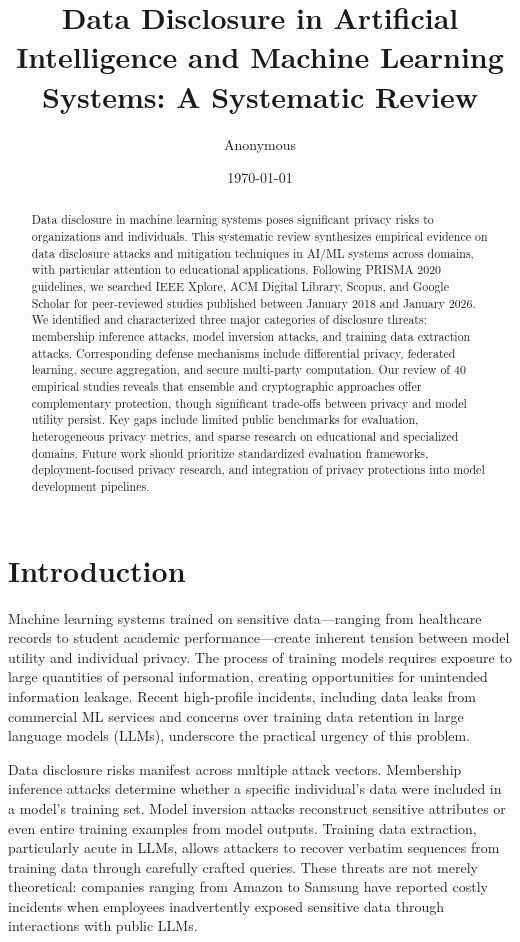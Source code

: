 \documentclass[11pt,a4paper]{article}
\title{Data Disclosure in Artificial Intelligence and Machine Learning Systems: A Systematic Review}
\author{Anonymous}
\date{\today}
\begin{document}
\maketitle

\begin{abstract}
Data disclosure in machine learning systems poses significant privacy risks to organizations and individuals. This systematic review synthesizes empirical evidence on data disclosure attacks and mitigation techniques in AI/ML systems across domains, with particular attention to educational applications. Following PRISMA 2020 guidelines, we searched IEEE Xplore, ACM Digital Library, Scopus, and Google Scholar for peer-reviewed studies published between January 2018 and January 2026. We identified and characterized three major categories of disclosure threats: membership inference attacks, model inversion attacks, and training data extraction attacks. Corresponding defense mechanisms include differential privacy, federated learning, secure aggregation, and secure multi-party computation. Our review of 40 empirical studies reveals that ensemble and cryptographic approaches offer complementary protection, though significant trade-offs between privacy and model utility persist. Key gaps include limited public benchmarks for evaluation, heterogeneous privacy metrics, and sparse research on educational and specialized domains. Future work should prioritize standardized evaluation frameworks, deployment-focused privacy research, and integration of privacy protections into model development pipelines.
\end{abstract}

\section{Introduction}

Machine learning systems trained on sensitive data—ranging from healthcare records to student academic performance—create inherent tension between model utility and individual privacy. The process of training models requires exposure to large quantities of personal information, creating opportunities for unintended information leakage. Recent high-profile incidents, including data leaks from commercial ML services and concerns over training data retention in large language models (LLMs), underscore the practical urgency of this problem.

Data disclosure risks manifest across multiple attack vectors. Membership inference attacks determine whether a specific individual's data were included in a model's training set. Model inversion attacks reconstruct sensitive attributes or even entire training examples from model outputs. Training data extraction, particularly acute in LLMs, allows attackers to recover verbatim sequences from training data through carefully crafted queries. These threats are not merely theoretical: companies ranging from Amazon to Samsung have reported costly incidents when employees inadvertently exposed sensitive data through interactions with public LLMs.
\end{document}
